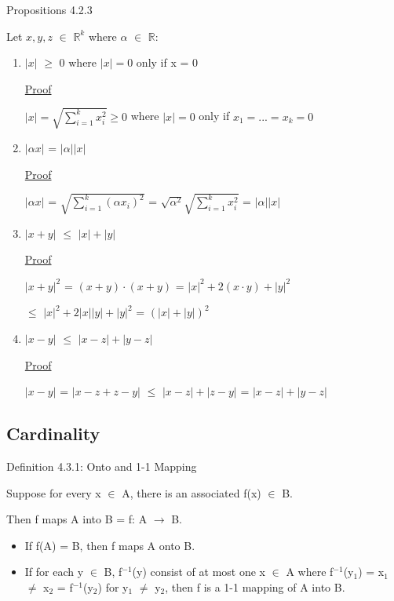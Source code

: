 \newpage

{ \color{blue} Propositions 4.2.3 } 

	\qquad Let $x,y,z$ $\in$ $\mathbb{R}^k$ where $\alpha$ $\in$ $\mathbb{R}$:
	\begin{enumerate}[label=(\alph*), leftmargin=2cm, itemsep=0.4em]
		\item $|x|$ $\geq$ 0 where $|x| = 0$ only if x = 0

			{ \color{magenta} \underline{Proof} } 
		
				$|x| = \sqrt{\sum_{i=1}^{k} x_i^2} \geq 0$ where $|x| = 0$ only if $x_1 = ... = x_k = 0$ 

		\item $|\alpha x|$ = $|\alpha| |x|$

			{ \color{magenta} \underline{Proof} } 
		
				$|\alpha x|$ = $\sqrt{\sum_{i=1}^k (\alpha x_i)^2}$
				= $\sqrt{\alpha^2} \sqrt{\sum_{i=1}^k x_i^2}$ = $|\alpha| |x|$
	
		\item $|x+y|$ $\leq$ $|x| + |y|$

			{ \color{magenta} \underline{Proof} } 
		
				$|x+y|^2$ = $(x+y) \cdot (x+y)$ = $|x|^2 + 2(x \cdot y) + |y|^2$

				$\leq$ $|x|^2 + 2|x||y| + |y|^2$ = $(|x|+|y|)^2$

		\item $|x-y|$ $\leq$ $|x-z| + |y-z|$

			{ \color{magenta} \underline{Proof} } 
		
				$|x-y|$ = $|x-z + z-y|$ $\leq$ $|x-z| + |z-y|$ = $|x-z| + |y-z|$
	\end{enumerate}





\subsection{Cardinality}

{ \color{blue} Definition 4.3.1: Onto and 1-1 Mapping } 

	\begin{adjustbox}{minipage=14cm, right}
		Suppose for every x $\in$ A, there is an associated f(x) $\in$ B.

		Then f maps A into B = f: A $\rightarrow$ B.
		\begin{itemize}[leftmargin=1cm, itemsep=0.4em]
			\item If f(A) = B, then f maps A onto B.
			
			\item If for each y $\in$ B, f$^{-1}$(y) consist of at most one x $\in$ A
				where f$^{-1}$(y$_1$) = x$_1$ $\neq$ x$_2$ = f$^{-1}$(y$_2$) for y$_1$ $\neq$ y$_2$,
				then f is a 1-1 mapping of A into B.
		\end{itemize}
	\end{adjustbox}

